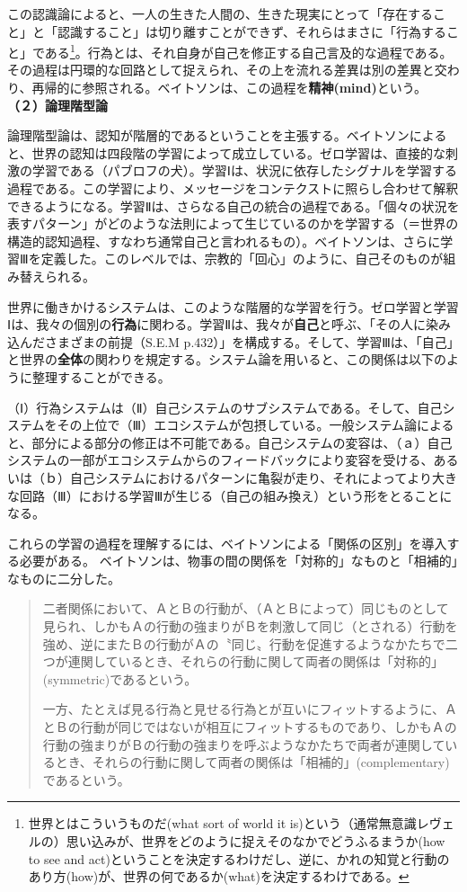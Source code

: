 \documentclass[b5j,twoside,twocolumn]{utarticle}
\begin{document}
この認識論によると、一人の生きた人間の、生きた現実にとって「存在すること」と「認識すること」は切り離すことができず、それらはまさに「行為すること」である\footnote{世界とはこういうものだ(what sort of world it is)という（通常無意識レヴェルの）思い込みが、世界をどのように捉えそのなかでどうふるまうか(how to see and act)ということを決定するわけだし、逆に、かれの知覚と行動のあり方(how)が、世界の何であるか(what)を決定するわけである。}。行為とは、それ自身が自己を修正する自己言及的な過程である。その過程は円環的な回路として捉えられ、その上を流れる差異は別の差異と交わり、再帰的に参照される。ベイトソンは、この過程を\textbf{精神(mind)}という。\\
\textbf{（２）論理階型論}


論理階型論は、認知が階層的であるということを主張する。ベイトソンによると、世界の認知は四段階の学習によって成立している。ゼロ学習は、直接的な刺激の学習である（パブロフの犬）。学習Ⅰは、状況に依存したシグナルを学習する過程である。この学習により、メッセージをコンテクストに照らし合わせて解釈できるようになる。学習Ⅱは、さらなる自己の統合の過程である。「個々の状況を表すパターン」がどのような法則によって生じているのかを学習する（＝世界の構造的認知過程、すなわち通常自己と言われるもの）。ベイトソンは、さらに学習Ⅲを定義した。このレベルでは、宗教的「回心」のように、自己そのものが組み替えられる。


世界に働きかけるシステムは、このような階層的な学習を行う。ゼロ学習と学習Ⅰは、我々の個別の\textbf{行為}に関わる。学習Ⅱは、我々が\textbf{自己}と呼ぶ、「その人に染み込んださまざまの前提（S.E.M p.432）」を構成する。そして、学習Ⅲは、「自己」と世界の\textbf{全体}の関わりを規定する。システム論を用いると、この関係は以下のように整理することができる\cite{JIKO}。

（Ⅰ）行為システムは（Ⅱ）自己システムのサブシステムである。そして、自己システムをその上位で（Ⅲ）エコシステムが包摂している。一般システム論によると、部分による部分の修正は不可能である。自己システムの変容は、（ａ）自己システムの一部がエコシステムからのフィードバックにより変容を受ける、あるいは（ｂ）自己システムにおけるパターンに亀裂が走り、それによってより大きな回路（Ⅲ）における学習Ⅲが生じる（自己の組み換え）という形をとることになる。


これらの学習の過程を理解するには、ベイトソンによる「関係の区別」を導入する必要がある。
ベイトソンは、物事の間の関係を「対称的」なものと「相補的」なものに二分した。
\begin{quote}
二者関係において、ＡとＢの行動が、（ＡとＢによって）同じものとして見られ、しかもＡの行動の強まりがＢを刺激して同じ（とされる）行動を強め、逆にまたＢの行動がＡの〝同じ〟行動を促進するようなかたちで二つが連関しているとき、それらの行動に関して両者の関係は「対称的」(symmetric)であるという。


一方、たとえば見る行為と見せる行為とが互いにフィットするように、ＡとＢの行動が同じではないが相互にフィットするものであり、しかもＡの行動の強まりがＢの行動の強まりを呼ぶようなかたちで両者が連関しているとき、それらの行動に関して両者の関係は「相補的」(complementary)であるという。%
\end{quote}
\end{document}
